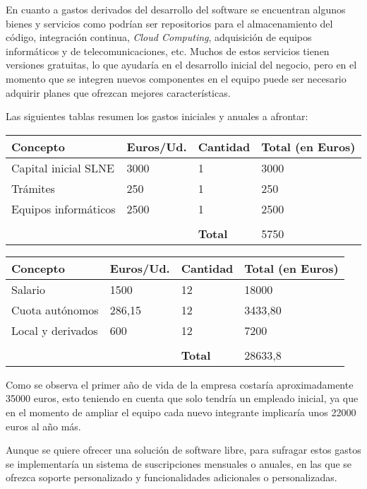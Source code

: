 En cuanto a gastos derivados del desarrollo del software se encuentran algunos bienes y servicios como podrían ser repositorios para el almacenamiento del código, integración continua, \textit{Cloud Computing}, adquisición de equipos informáticos y de telecomunicaciones, etc. Muchos de estos servicios tienen versiones gratuitas, lo que ayudaría en el desarrollo inicial del negocio, pero en el momento que se integren nuevos componentes en el equipo puede ser necesario adquirir planes que ofrezcan mejores características.

\bigskip
Las siguientes tablas resumen los gastos iniciales y anuales a afrontar:

\begin{table}[!h]
	\centering
	\begin{adjustbox}{width=1\textwidth}
	\begin{tabular}{|l|l|l|l|}
		\hline
		\textbf{Concepto} & \textbf{Euros/Ud.} & \textbf{Cantidad} & \textbf{Total (en Euros)} \\ \hline
		Capital inicial SLNE & 3000 & 1 & 3000 \\ \hline
		Trámites & 250 & 1 & 250 \\ \hline
		Equipos informáticos & 2500 & 1 & 2500 \\ \hline
		&  &  &  \\
		&  & \textbf{Total} & 5750 \\ \hline
	\end{tabular}
	\end{adjustbox}
\end{table}

\begin{table}[!h]
	\centering
	\begin{adjustbox}{width=1\textwidth}
	\begin{tabular}{|l|l|l|l|}
		\hline
		\textbf{Concepto} & \textbf{Euros/Ud.} & \textbf{Cantidad} & \textbf{Total (en Euros)} \\ \hline
		Salario & 1500 & 12 & 18000 \\ \hline
		Cuota autónomos & 286,15 & 12 & 3433,80 \\ \hline
		Local y derivados & 600 & 12 & 7200 \\ \hline
		&  &  &  \\
		&  & \textbf{Total} & 28633,8 \\ \hline
	\end{tabular}
	\end{adjustbox}
\end{table}

Como se observa el primer año de vida de la empresa costaría aproximadamente 35000 euros, esto teniendo en cuenta que solo tendría un empleado inicial, ya que en el momento de ampliar el equipo cada nuevo integrante implicaría unos 22000 euros al año más.

Aunque se quiere ofrecer una solución de software libre, para sufragar estos gastos se implementaría un sistema de suscripciones mensuales o anuales, en las que se ofrezca soporte personalizado y funcionalidades adicionales o personalizadas.